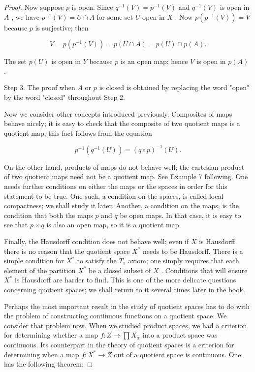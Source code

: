 \begin{proof}
Now suppose \(p\) is open. Since \({q}^{-1}\left( V\right)  = {p}^{-1}\left( V\right)\) and \({q}^{-1}\left( V\right)\) is open in \(A\) , we have \({p}^{-1}\left( V\right)  = U \cap  A\) for some set \(U\) open in \(X\) . Now \(p\left( {{p}^{-1}\left( V\right) }\right)  = V\) because \(p\) is surjective; then

\[
V = p\left( {{p}^{-1}\left( V\right) }\right)  = p\left( {U \cap  A}\right)  = p\left( U\right)  \cap  p\left( A\right) .
\]

The set \(p\left( U\right)\) is open in \(Y\) because \(p\) is an open map; hence \(V\) is open in \(p\left( A\right)\) .

Step 3. The proof when \(A\) or \(p\) is closed is obtained by replacing the word "open" by the word "closed" throughout Step 2.

Now we consider other concepts introduced previously. Composites of maps behave nicely; it is easy to check that the composite of two quotient maps is a quotient map; this fact follows from the equation

\[
{p}^{-1}\left( {{q}^{-1}\left( U\right) }\right)  = {\left( q \circ  p\right) }^{-1}\left( U\right) .
\]

On the other hand, products of maps do not behave well; the cartesian product of two quotient maps need not be a quotient map. See Example 7 following. One needs further conditions on either the maps or the spaces in order for this statement to be true. One such, a condition on the spaces, is called local compactness; we shall study it later. Another, a condition on the maps, is the condition that both the maps \(p\) and \(q\) be open maps. In that case, it is easy to see that \(p \times  q\) is also an open map, so it is a quotient map.

Finally, the Hausdorff condition does not behave well; even if \(X\) is Hausdorff. there is no reason that the quotient space \({X}^{ * }\) needs to be Hausdorff. There is a simple condition for \({X}^{ * }\) to satisfy the \({T}_{1}\) axiom; one simply requires that each element of the partition \({X}^{ * }\) be a closed subset of \(X\) . Conditions that will ensure \({X}^{ * }\) is Hausdorff are harder to find. This is one of the more delicate questions concerning quotient spaces; we shall return to it several times later in the book.

Perhaps the most important result in the study of quotient spaces has to do with the problem of constructing continuous functions on a quotient space. We consider that problem now. When we studied product spaces, we had a criterion for determining whether a map \(f : Z \rightarrow  \prod {X}_{\alpha }\) into a product space was continuous. Its counterpart in the theory of quotient spaces is a criterion for determining when a map \(f : {X}^{ * } \rightarrow  Z\) out of a quotient space is continuous. One has the following theorem:
\end{proof}

